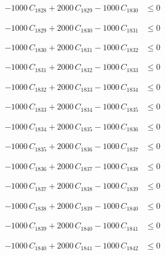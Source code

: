 \documentclass[a4paper,11pt]{article}
\begin{document}
\begin{align}
-1000\,C_{1828} + 2000\,C_{1829} - 1000\,C_{1830} &\leq 0 \nonumber
\end{align}

\begin{align}
-1000\,C_{1829} + 2000\,C_{1830} - 1000\,C_{1831} &\leq 0 \nonumber
\end{align}

\begin{align}
-1000\,C_{1830} + 2000\,C_{1831} - 1000\,C_{1832} &\leq 0 \nonumber
\end{align}

\begin{align}
-1000\,C_{1831} + 2000\,C_{1832} - 1000\,C_{1833} &\leq 0 \nonumber
\end{align}

\begin{align}
-1000\,C_{1832} + 2000\,C_{1833} - 1000\,C_{1834} &\leq 0 \nonumber
\end{align}

\begin{align}
-1000\,C_{1833} + 2000\,C_{1834} - 1000\,C_{1835} &\leq 0 \nonumber
\end{align}

\begin{align}
-1000\,C_{1834} + 2000\,C_{1835} - 1000\,C_{1836} &\leq 0 \nonumber
\end{align}

\begin{align}
-1000\,C_{1835} + 2000\,C_{1836} - 1000\,C_{1837} &\leq 0 \nonumber
\end{align}

\begin{align}
-1000\,C_{1836} + 2000\,C_{1837} - 1000\,C_{1838} &\leq 0 \nonumber
\end{align}

\begin{align}
-1000\,C_{1837} + 2000\,C_{1838} - 1000\,C_{1839} &\leq 0 \nonumber
\end{align}

\begin{align}
-1000\,C_{1838} + 2000\,C_{1839} - 1000\,C_{1840} &\leq 0 \nonumber
\end{align}

\begin{align}
-1000\,C_{1839} + 2000\,C_{1840} - 1000\,C_{1841} &\leq 0 \nonumber
\end{align}

\begin{align}
-1000\,C_{1840} + 2000\,C_{1841} - 1000\,C_{1842} &\leq 0 \nonumber
\end{align}
\end{document}
